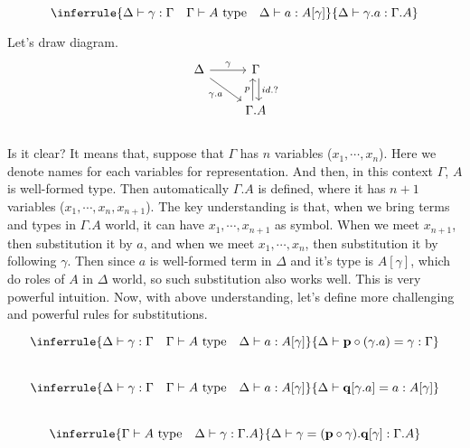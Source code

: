 \documentclass[12pt, a4paper, openany, twoside]{book}
\theoremstyle{definition}
\theoremstyle{remark}
\theoremstyle{plain}
\numberwithin{equation}{section}
\begin{document}
\vspace{4mm}
\begin{tcolorbox}[colback=yellow!10!white,colframe=green!75!black,title=Construction 1.3.10.]\label{subst extend}
\[\inferrule
{\Delta \vdash \gamma : \Gamma \quad \Gamma \vdash A \text{ type} \quad \Delta \vdash a : A[\gamma]}
{\Delta \vdash \gamma.a : \Gamma.A}\]
\end{tcolorbox}
Let's draw diagram. \\
\[
\begin{tikzcd}
    \Delta \arrow[r, "\gamma"] \arrow[rd, "\gamma.a"'] & \Gamma \arrow[d, "id.?", shift left]\\
    & \Gamma.A \arrow[u, "p", shift left]
\end{tikzcd}
\]
\\
Is it clear? It means that, suppose that $\Gamma$ has $n$ variables ($x_1, \cdots, x_n$). Here we denote names for each variables for representation. 
And then, in this context $\Gamma$, $A$ is well-formed type. Then automatically $\Gamma.A$ is defined, where 
it has $n+1$ variables ($x_1, \cdots, x_n, x_{n+1}$). The key understanding is that, when we bring 
terms and types in $\Gamma.A$ world, it can have $x_1, \cdots, x_{n+1}$ as symbol. When we meet $x_{n+1}$, then substitution it by $a$, and when we meet $x_1, \cdots, x_n$, then substitution it by following $\gamma$. 
Then since $a$ is well-formed term in $\Delta$ and it's type is $A[\gamma]$, which do roles of $A$ in $\Delta$ world, so such substitution also works well. This is very powerful intuition. 
Now, with above understanding, let's define more challenging and powerful rules for substitutions. 
\begin{tcolorbox}[colback=yellow!10!white,colframe=green!75!black,title=Construction 1.3.11.]

\[
\inferrule
{\Delta \vdash \gamma : \Gamma \quad \Gamma \vdash A \text{ type} \quad \Delta \vdash a : A[\gamma]}
{\Delta \vdash \mathbf{p} \circ (\gamma.a) = \gamma : \Gamma}
\]
\\
\[
\inferrule
{\Delta \vdash \gamma : \Gamma \quad \Gamma \vdash A \text{ type} \quad \Delta \vdash a : A[\gamma]}
{\Delta \vdash \mathbf{q}[\gamma.a] = a : A[\gamma]}
\]
\\
\[
\inferrule
{\Gamma \vdash A \text{ type} \quad \Delta \vdash \gamma : \Gamma.A}
{\Delta \vdash \gamma = (\mathbf{p}\circ \gamma).\mathbf{q}[\gamma] : \Gamma.A}
\]
\\
\end{tcolorbox} 
\end{document}
